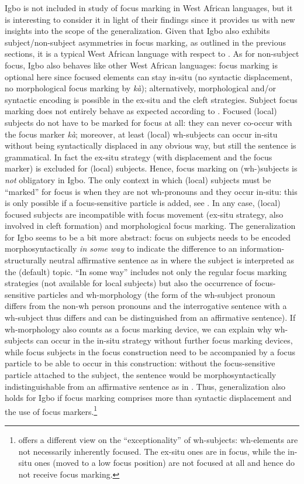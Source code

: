 \documentclass[output=paper,colorlinks,citecolor=brown]{langscibook}
\begin{document}
Igbo is not included in  study of focus marking in West African languages, but it is interesting to consider it in light of their findings since it provides us with new insights into the scope of the generalization. Given that Igbo also exhibits subject\slash non-subject asymmetries in focus marking, as outlined in the previous sections, it is a typical West African language with respect to . As for non-subject focus, Igbo also behaves like other West African languages: focus marking is optional here since focused elements can stay in-situ (no syntactic displacement, no morphological focus marking by \textit{k\`a}); alternatively, morphological and/or syntactic encoding is possible in the ex-situ and the cleft strategies. Subject focus marking does not entirely behave as expected according to . Focused (local) subjects do not have to be marked for focus at all: they can never  co-occur with the focus marker \textit{k\`a}; moreover, at least (local) wh-subjects can occur in-situ without being syntactically displaced in any obvious way, but still the sentence is grammatical. In fact the ex-situ strategy (with displacement and the focus marker) is excluded for (local) subjects. Hence, focus marking on (wh-)subjects is \textit{not} obligatory in Igbo. The only context in which (local) subjects must be ``marked'' for focus is when they are not wh-pronouns and they occur in-situ: this is only possible if a  focus-sensitive particle is added, see . In any case, (local) focused subjects are incompatible with focus movement (ex-situ strategy, also involved  in cleft formation) and morphological focus marking. The generalization for Igbo seems to be a bit more abstract: focus on subjects needs to be encoded morphosyntactically \textit{in some way} to indicate the difference to an information-structurally neutral affirmative sentence as in  where the subject is interpreted as the (default) topic.  ``In some way'' includes not only the regular focus marking strategies (not available for local subjects) but also the occurrence of focus-sensitive particles and wh-morphology (the form of the wh-subject pronoun differs from the non-wh person pronouns and the interrogative sentence with a wh-subject thus differs and can be distinguished from an affirmative sentence). If wh-morphology also counts as a focus marking device, we can explain why wh-subjects can occur in the in-situ strategy without further focus marking devices, while focus subjects in the focus construction need to be accompanied by a focus particle to be able to occur in this construction: without the focus-sensitive particle attached to the subject, the sentence would be morphosyntactically indistinguishable from an affirmative sentence as in . Thus,  generalization also holds for Igbo if focus marking comprises more than syntactic displacement and the use of focus markers.\footnote{\citet{Aboh2007} offers a different view on the “exceptionality” of wh-subjects: wh-elements are not necessarily inherently focused. The ex-situ ones are in focus, while the in-situ ones (moved to a low focus position) are not focused at all and hence do not receive focus marking.}
\end{document}
